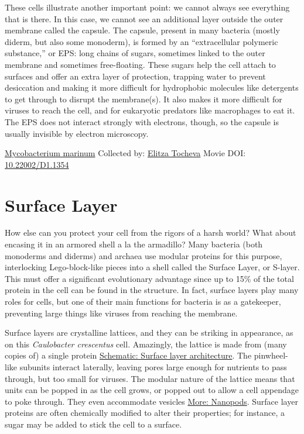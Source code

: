 \documentclass[]{tufte-book}
\begin{document}
These cells illustrate another important point: we cannot always see everything that is there. In this case, we cannot see an additional layer outside the outer membrane called the capsule. The capsule, present in many bacteria (mostly diderm, but also some monoderm), is formed by an ``extracellular polymeric substance,'' or EPS: long chains of sugars, sometimes linked to the outer membrane and sometimes free-floating. These sugars help the cell attach to surfaces and offer an extra layer of protection, trapping water to prevent desiccation and making it more difficult for hydrophobic molecules like detergents to get through to disrupt the membrane(s). It also makes it more difficult for viruses to reach the cell, and for eukaryotic predators like macrophages to eat it. The EPS does not interact strongly with electrons, though, so the capsule is usually invisible by electron microscopy.



\hypertarget{htmlwidget-8fa76fee4185bd2be247}{}

\label{fig:2-5}\protect\hyperlink{tree}{Mycobacterium marinum} Collected by: \protect\hyperlink{elitza_tocheva}{Elitza Tocheva} Movie DOI: \href{https://doi.org/10.22002/D1.1354}{10.22002/D1.1354}

\hypertarget{surface-layer}{%
\section{Surface Layer}\label{surface-layer}}

How else can you protect your cell from the rigors of a harsh world? What about encasing it in an armored shell a la the armadillo? Many bacteria (both monoderms and diderms) and archaea use modular proteins for this purpose, interlocking Lego-block-like pieces into a shell called the Surface Layer, or S-layer. This must offer a significant evolutionary advantage since up to 15\% of the total protein in the cell can be found in the structure. In fact, surface layers play many roles for cells, but one of their main functions for bacteria is as a gatekeeper, preventing large things like viruses from reaching the membrane.

Surface layers are crystalline lattices, and they can be striking in appearance, as on this \emph{Caulobacter crescentus} cell. Amazingly, the lattice is made from (many copies of) a single protein \protect\hyperlink{Surface_layer_architecture}{Schematic: Surface layer architecture}. The pinwheel-like subunits interact laterally, leaving pores large enough for nutrients to pass through, but too small for viruses. The modular nature of the lattice means that units can be popped in as the cell grows, or popped out to allow a cell appendage to poke through. They even accommodate vesicles \protect\hyperlink{Nanopods}{More: Nanopods}. Surface layer proteins are often chemically modified to alter their properties; for instance, a sugar may be added to stick the cell to a surface.
\end{document}
